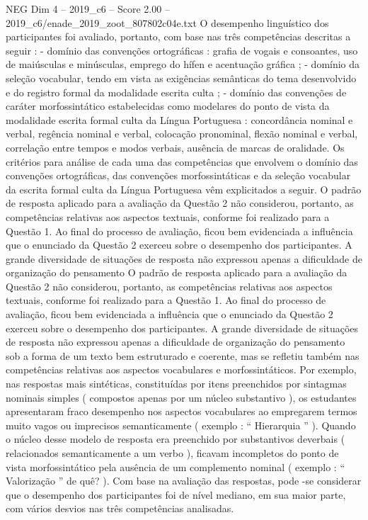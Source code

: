 \begin{textsample}{NEG Dim 4 – 2019\_c6 – Score 2.00 – 2019\_c6/enade\_2019\_zoot\_807802c04e.txt}
O desempenho linguístico dos participantes foi avaliado, portanto, com base nas três competências descritas a seguir : - domínio das convenções ortográficas : grafia de vogais e consoantes, uso de maiúsculas e minúsculas, emprego do hífen e acentuação gráfica ; - domínio da seleção vocabular, tendo em vista as exigências semânticas do tema desenvolvido e do registro formal da modalidade escrita culta ; - domínio das convenções de caráter morfossintático estabelecidas como modelares do ponto de vista da modalidade escrita formal culta da Língua Portuguesa : concordância nominal e verbal, regência nominal e verbal, colocação pronominal, flexão nominal e verbal, correlação entre tempos e modos verbais, ausência de marcas de oralidade.
Os critérios para análise de cada uma das competências que envolvem o domínio das convenções ortográficas, das convenções morfossintáticas e da seleção vocabular da escrita formal culta da Língua Portuguesa vêm explicitados a seguir.
O padrão de resposta aplicado para a avaliação da Questão 2 não considerou, portanto, as competências relativas aos aspectos textuais, conforme foi realizado para a Questão 1.
Ao final do processo de avaliação, ficou bem evidenciada a influência que o enunciado da Questão 2 exerceu sobre o desempenho dos participantes.
A grande diversidade de situações de resposta não expressou apenas a dificuldade de organização do pensamento O padrão de resposta aplicado para a avaliação da Questão 2 não considerou, portanto, as competências relativas aos aspectos textuais, conforme foi realizado para a Questão 1.
Ao final do processo de avaliação, ficou bem evidenciada a influência que o enunciado da Questão 2 exerceu sobre o desempenho dos participantes.
A grande diversidade de situações de resposta não expressou apenas a dificuldade de organização do pensamento sob a forma de um texto bem estruturado e coerente, mas se refletiu também nas competências relativas aos aspectos vocabulares e morfossintáticos.
Por exemplo, nas respostas mais sintéticas, constituídas por itens preenchidos por sintagmas nominais simples ( compostos apenas por um núcleo substantivo ), os estudantes apresentaram fraco desempenho nos aspectos vocabulares ao empregarem termos muito vagos ou imprecisos semanticamente ( exemplo : “ Hierarquia ” ).
Quando o núcleo desse modelo de resposta era preenchido por substantivos deverbais ( relacionados semanticamente a um verbo ), ficavam incompletos do ponto de vista morfossintático pela ausência de um complemento nominal ( exemplo : “ Valorização ” de quê? ).
Com base na avaliação das respostas, pode -se considerar que o desempenho dos participantes foi de nível mediano, em sua maior parte, com vários desvios nas três competências analisadas.

\end{textsample}
